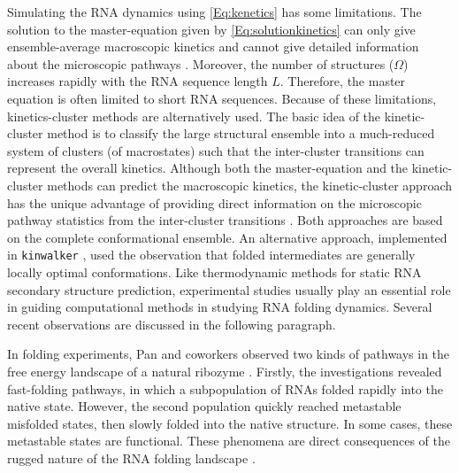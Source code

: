 Simulating the \ac{RNA} dynamics using \autoref{Eq:kenetics} has some limitations. The solution to the master-equation given by \autoref{Eq:solutionkinetics} can only give ensemble-average macroscopic kinetics and cannot give detailed information about the microscopic pathways \cite{zhang06_explor_compl_foldin_kinet_rna_hairp}. Moreover, the number of structures ($\Omega$) increases rapidly with the \ac{RNA} sequence length $L$. Therefore, the master equation is often limited to short \ac{RNA} sequences. Because of these limitations, kinetics-cluster methods are alternatively used. The basic idea of the kinetic-cluster method is to classify the large structural ensemble into a much-reduced system of clusters (of macrostates) such that the inter-cluster transitions can represent the overall kinetics. Although both the master-equation and the kinetic-cluster methods can predict the macroscopic kinetics, the kinetic-cluster approach has the unique advantage of providing direct information on the microscopic pathway statistics from the inter-cluster transitions \cite{zhang06_explor_compl_foldin_kinet_rna_hairp}. Both approaches are based on the complete conformational ensemble. An alternative approach, implemented in \texttt{kinwalker} \cite{geis2008folding}, used the observation that folded intermediates are generally locally optimal conformations.  Like thermodynamic methods for static \ac{RNA} secondary structure prediction, experimental studies usually play an essential role in guiding computational methods in studying \ac{RNA} folding dynamics.  Several recent observations are discussed in the following paragraph.

In folding experiments, Pan and coworkers observed two kinds of pathways in the free energy landscape of a natural ribozyme \cite{pan97_foldin_rna_invol_paral_pathw}. Firstly, the investigations revealed fast-folding pathways, in which a subpopulation of \acp{RNA} folded rapidly into the native state. However, the second population quickly reached metastable misfolded states, then slowly folded into the native structure. In some cases, these metastable states are functional. These phenomena are direct consequences of the rugged nature of the \ac{RNA} folding landscape \cite{solomatin10_multip_nativ_states_reveal_persis}. 

